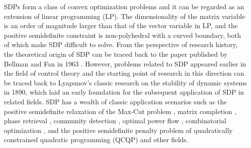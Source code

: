 \documentclass{jcmlatex}
\begin{document}
SDPs form a class of convex optimization problems and it can be regarded as an extension of linear programming (LP). The dimensionality of the matrix variable is an order of magnitude larger than that of the vector variable in LP, and the positive semidefinite constraint is non-polyhedral with a curved boundary, both of which make SDP difficult to solve. From the perspective of research history, the theoretical origin of SDP can be traced back to the paper published by Bellman and Fan in 1963 \cite{bellman1963systems}. However, problems related to SDP appeared earlier in the field of control theory and the starting point of research in this direction can be traced back to Lyapunov's classic research on the stability of dynamic systems in 1890, which laid an early foundation for the subsequent application of SDP in related fields. SDP has a wealth of classic application scenarios such as the positive semidefinite relaxation of the Max-Cut problem \cite{delorme1993laplacian}, matrix completion \cite{srebro2005rank}, phase retrieval \cite{chai2010array,waldspurger2015phase}, community detection \cite{mathieu2010correlation}, optimal power flow \cite{bai2008semidefinite}, combinatorial optimization \cite{alizadeh1995interior}, and the positive semidefinite penalty problem of quadratically constrained quadratic programming (QCQP) \cite{gu2021positive} and other fields.
\end{document}
